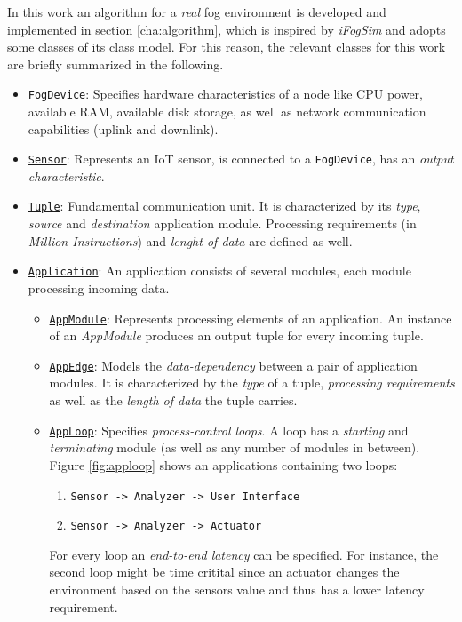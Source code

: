 In this work an algorithm for a \textit{real} fog environment is developed and implemented in section \ref{cha:algorithm}, which is inspired by \textit{iFogSim} and adopts some classes of its class model. For this reason, the relevant classes for this work are briefly summarized in the following.\\

\begin{itemize}
    \item \underline{\texttt{FogDevice}}: Specifies hardware characteristics of a node like CPU power, available RAM, available disk storage, as well as network communication capabilities (uplink and downlink).
    
    \item \underline{\texttt{Sensor}}: Represents an IoT sensor, is connected to a \texttt{FogDevice}, has an \textit{output characteristic}.
    
    \item \underline{\texttt{Tuple}}: Fundamental communication unit. It is characterized by its \textit{type}, \textit{source} and \textit{destination} application module. Processing requirements (in \textit{Million Instructions}) and \textit{lenght of data} are defined as well. 
    
    \item \underline{\texttt{Application}}: An application consists of several modules, each module processing incoming data.
    \begin{itemize}
        \item \underline{\texttt{AppModule}}: Represents processing elements of an application. An instance of an \textit{AppModule} produces an output tuple for every incoming tuple.
        
        \item \underline{\texttt{AppEdge}}: Models the \textit{data-dependency} between a pair of application modules. It is characterized by the \textit{type} of a tuple, \textit{processing requirements} as well as the \textit{length of data} the tuple carries.
        
        \item \underline{\texttt{AppLoop}}: Specifies \textit{process-control loops}. A loop has a \textit{starting} and \textit{terminating} module (as well as any number of modules in between). Figure \ref{fig:apploop} shows an applications containing two loops: \begin{enumerate}
            \item \texttt{Sensor -> Analyzer -> User Interface}
            \item \texttt{Sensor -> Analyzer -> Actuator}
        \end{enumerate}
        For every loop an \textit{end-to-end latency} can be specified. For instance, the second loop might be time critital since an actuator changes the environment based on the sensors value and thus has a lower latency requirement.
    \end{itemize}
\end{itemize}

